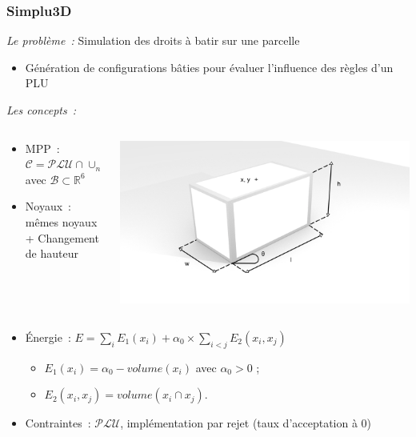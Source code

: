 \documentclass{beamer}
\begin{document}
\begin{frame}
\frametitle{Simplu3D}
\emph{Le probl\`eme~:}  Simulation des droits \`a batir sur une parcelle
\begin{itemize}
\item Génération de configurations bâties pour évaluer l'influence des règles d'un PLU
\end{itemize}
\emph{Les concepts~:}
\begin{columns}
\begin{column}{0.55\textwidth}
\begin{itemize}
\item MPP~: $ \mathcal{C} =\mathcal{PLU} \cap \cup_{n} \mathcal{B}^n$\\avec $\mathcal{B}  \subset  \mathds{R}^{6}$
\item Noyaux~: mêmes noyaux + Changement de hauteur
\end{itemize}
\end{column}
\begin{column}{0.45\textwidth}
 \includegraphics[width=\textwidth]{boiteFin.png}
\end{column}
\end{columns}
\begin{itemize}
\item \'Energie~: $E = \sum_i E_1(x_i) + \alpha_{0} \times \sum_{i<j} E_2(x_i,x_j)$
\begin{itemize}
\item $E_1(x_i)=\alpha_{0} - volume(x_i)$ avec $\alpha_{0}>0$ ;
\item $E_2(x_i,x_j) = volume(x_i \cap x_j)$.
\end{itemize}
\item Contraintes~:  $\mathcal{PLU}$, implémentation par rejet (taux d'acceptation à 0)
\end{itemize}
\end{frame}
\end{document}
